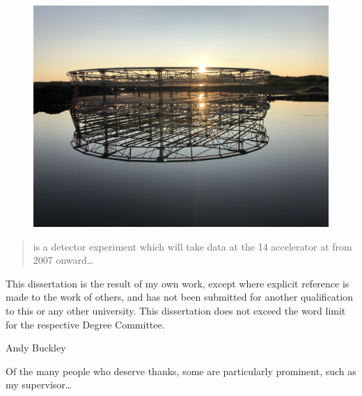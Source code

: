 
\begin{figure}
    \includegraphics[width=\largefigwidth]{diagrams/sunrise}
\end{figure}

\begin{abstract}%
    \LHCb is a \bphysics detector experiment which will take data at
    the \unit{14}{\TeV} \LHC accelerator at \CERN from 2007 onward\dots
\end{abstract}


\begin{declaration}
    This dissertation is the result of my own work, except where explicit
    reference is made to the work of others, and has not been submitted
    for another qualification to this or any other university. This
    dissertation does not exceed the word limit for the respective Degree
    Committee.
    \vspace*{1cm}
    \begin{flushright}
        Andy Buckley
    \end{flushright}
\end{declaration}


\begin{acknowledgements}
    Of the many people who deserve thanks, some are particularly prominent,
    such as my supervisor\dots
\end{acknowledgements}


